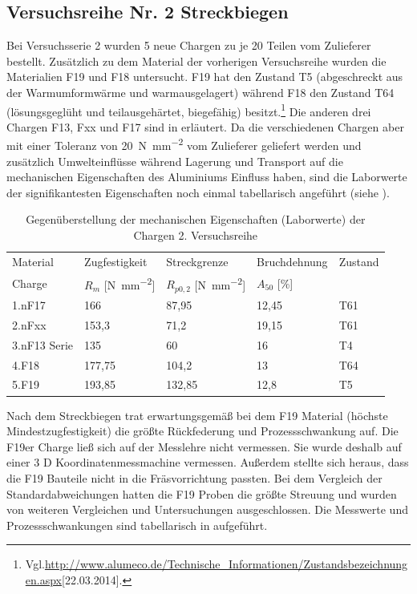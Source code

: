 \documentclass[12pt,a4paper,parskip,twoside,BCOR5mm,headsepline]{scrartcl}
\begin{document}
\newpage
\subsection{Versuchsreihe Nr. 2 Streckbiegen}
Bei Versuchsserie 2 wurden 5 neue Chargen zu je 20 Teilen vom Zulieferer bestellt. Zusätzlich zu dem Material der vorherigen Versuchsreihe wurden die Materialien F19 und F18 untersucht. F19 hat den Zustand T5 (abgeschreckt aus der Warmumformwärme und warmausgelagert) während F18 den Zustand T64 (lösungsgeglüht und teilausgehärtet, biegefähig) besitzt.\footnote{Vgl.\url{http://www.alumeco.de/Technische_Informationen/Zustandsbezeichnungen.aspx}[22.03.2014].}  Die anderen drei Chargen F13, Fxx und F17 sind in  erläutert. Da die verschiedenen Chargen aber mit einer Toleranz von \SI{20}{\newton\per\milli\meter\squared} vom Zulieferer geliefert werden und zusätzlich Umwelteinflüsse während Lagerung und Transport auf die mechanischen Eigenschaften des Aluminiums Einfluss haben,  sind die Laborwerte der signifikantesten Eigenschaften noch einmal tabellarisch angeführt (siehe ).\\
\begin{table}[hbtp]
\caption{Gegenüberstellung der mechanischen Eigenschaften (Laborwerte) der Chargen 2. Versuchsreihe}
\label{tab:eigenschaften2}
\centering
\begin{tabular}{lllll}
\toprule
Material & Zugfestigkeit & Streckgrenze & Bruchdehnung & Zustand \\
Charge &  $R_m$ [\si{\newton\per\milli\meter\squared}] &  $R_{p0,2}$ [\si{\newton\per\milli\meter\squared}] &  $A_{50}$ [\%] & \\
\midrule
1.nF17 & 166 & 87,95 & 12,45 & T61 \\
2.nFxx & 153,3 & 71,2 &  19,15 & T61 \\
3.nF13 Serie & 135 & 60 & 16  & T4 \\
4.F18 & 177,75 & 104,2 & 13 & T64 \\
5.F19 & 193,85 & 132,85 & 12,8 &  T5 \\

\bottomrule




\end{tabular}
\end{table}

 
Nach dem Streckbiegen trat erwartungsgemäß bei dem F19 Material (höchste Mindestzugfestigkeit) die größte Rückfederung und Prozessschwankung auf. Die F19er Charge ließ sich auf der Messlehre nicht vermessen. Sie wurde deshalb auf einer 3 D Koordinatenmessmachine vermessen.  Außerdem stellte sich heraus, dass die F19 Bauteile nicht in die Fräsvorrichtung passten. Bei dem Vergleich der Standardabweichungen hatten die  F19 Proben  die größte Streuung und wurden von weiteren Vergleichen und Untersuchungen ausgeschlossen. Die Messwerte und Prozessschwankungen sind tabellarisch in  aufgeführt.
\end{document}

